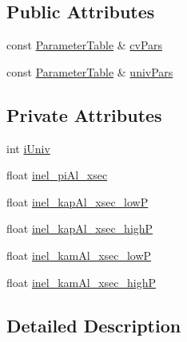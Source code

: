 \subsection*{Public Attributes}
\begin{DoxyCompactItemize}
\item 
const \hyperlink{class_neutrino_flux_reweight_1_1_parameter_table}{Parameter\-Table} \& \hyperlink{class_neutrino_flux_reweight_1_1_absorption_d_p_i_p_reweighter_ab830029670dfde65be3fc9a0bc40cd49}{cv\-Pars}
\item 
const \hyperlink{class_neutrino_flux_reweight_1_1_parameter_table}{Parameter\-Table} \& \hyperlink{class_neutrino_flux_reweight_1_1_absorption_d_p_i_p_reweighter_a47776d1d928633d93087b6fc9570f72d}{univ\-Pars}
\end{DoxyCompactItemize}
\subsection*{Private Attributes}
\begin{DoxyCompactItemize}
\item 
int \hyperlink{class_neutrino_flux_reweight_1_1_absorption_d_p_i_p_reweighter_a148d5a14a463e38ef23ed9511d26ba8f}{i\-Univ}
\item 
float \hyperlink{class_neutrino_flux_reweight_1_1_absorption_d_p_i_p_reweighter_af745299f29459ca26ac57b9bae817bdb}{inel\-\_\-pi\-Al\-\_\-xsec}
\item 
float \hyperlink{class_neutrino_flux_reweight_1_1_absorption_d_p_i_p_reweighter_a7035ed9b51c4053c042dd791bbe837d6}{inel\-\_\-kap\-Al\-\_\-xsec\-\_\-low\-P}
\item 
float \hyperlink{class_neutrino_flux_reweight_1_1_absorption_d_p_i_p_reweighter_a4c5d6fe2c15175a60e2641ae1c714408}{inel\-\_\-kap\-Al\-\_\-xsec\-\_\-high\-P}
\item 
float \hyperlink{class_neutrino_flux_reweight_1_1_absorption_d_p_i_p_reweighter_a3cef22dec7205f0331beb41c2eb35238}{inel\-\_\-kam\-Al\-\_\-xsec\-\_\-low\-P}
\item 
float \hyperlink{class_neutrino_flux_reweight_1_1_absorption_d_p_i_p_reweighter_a97ba47996c1cae70e4374d8856fdb4cd}{inel\-\_\-kam\-Al\-\_\-xsec\-\_\-high\-P}
\end{DoxyCompactItemize}


\subsection{Detailed Description}


